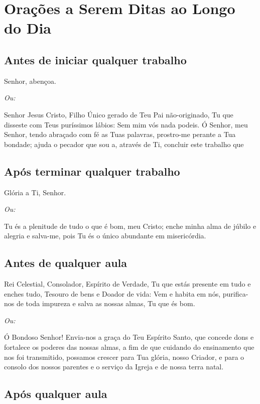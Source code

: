 \documentclass{subfiles}
\begin{document}
\chapter{Orações a Serem Ditas ao Longo do Dia}

\section*{Antes de iniciar qualquer trabalho}

Senhor, abençoa.

\textit{Ou:}

Senhor Jesus Cristo, Filho Único gerado de Teu Pai não-originado, Tu que 
disseste com Teus puríssimos lábios: Sem mim vós nada podeis. Ó Senhor, meu 
Senhor, tendo abraçado com fé as Tuas palavras, prostro-me perante a Tua 
bondade; ajuda o pecador que sou a, através de Ti, concluir este trabalho que 

\section*{Após terminar qualquer trabalho}

Glória a Ti, Senhor.

\textit{Ou:}

Tu és a plenitude de tudo o que é bom, meu Cristo; enche minha alma de júbilo 
e alegria e salva-me, pois Tu és o único abundante em misericórdia. 

 
\section*{Antes de qualquer aula} 

Rei Celestial, Consolador, Espírito de Verdade, Tu que estás presente em tudo 
e enches tudo, Tesouro de bens e Doador de vida: Vem e habita em nós,
purifica-nos de toda impureza e salva as nossas almas, Tu que és bom. 

\textit{Ou:}

Ó Bondoso Senhor! Envia-nos a graça do Teu Espírito Santo, que concede dons e
fortalece os poderes das nossas almas, a fim de que cuidando do ensinamento que
nos foi transmitido, possamos crescer para Tua glória, nosso Criador, e para o
consolo dos nossos parentes e o serviço da Igreja e de nossa terra natal.

\section*{Após qualquer aula}
\end{document}
